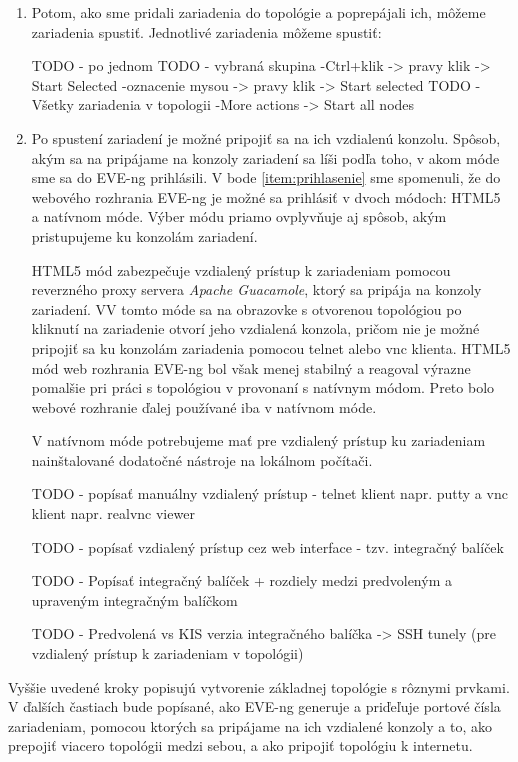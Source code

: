 \begin{enumerate}[noitemsep]
    \item Potom, ako sme pridali zariadenia do topológie a poprepájali ich, môžeme zariadenia spustiť. Jednotlivé zariadenia môžeme spustiť:

{\huge TODO - po jednom}
{\huge TODO - vybraná skupina
      -Ctrl+klik -> pravy klik -> Start Selected
      -oznacenie mysou -> pravy klik -> Start selected}
{\huge TODO - Všetky zariadenia v topologii
      -More actions -> Start all nodes}
      
    \item \label{item:vzdialeny_pristup} Po spustení zariadení je možné pripojiť sa na ich vzdialenú konzolu. Spôsob, akým sa na pripájame na konzoly zariadení sa líši podľa toho, v akom móde sme sa do EVE-ng prihlásili. V bode \ref{item:prihlasenie} sme spomenuli, že do webového rozhrania EVE-ng je možné sa prihlásiť v dvoch módoch: HTML5 a natívnom móde. Výber módu priamo ovplyvňuje aj spôsob, akým pristupujeme ku konzolám zariadení.
    
    HTML5 mód zabezpečuje vzdialený prístup k zariadeniam pomocou reverzného proxy servera \emph{Apache Guacamole}, ktorý sa pripája na konzoly zariadení. VV tomto móde sa na obrazovke s otvorenou topológiou po kliknutí na zariadenie otvorí jeho vzdialená konzola, pričom nie je možné pripojiť sa ku konzolám zariadenia pomocou telnet alebo vnc klienta. HTML5 mód web rozhrania EVE-ng bol však menej stabilný a reagoval výrazne pomalšie pri práci s topológiou v provonaní s natívnym módom. Preto bolo webové rozhranie ďalej používané iba v natívnom móde.
        
     V natívnom móde potrebujeme mať pre vzdialený prístup ku zariadeniam nainštalované dodatočné nástroje na lokálnom počítači. 
        
{\huge TODO - popísať manuálny vzdialený prístup - telnet klient napr. putty a vnc klient napr. realvnc viewer}
        
{\huge TODO - popísať vzdialený prístup cez web interface - tzv. integračný balíček}
        
{\huge TODO - Popísať integračný balíček + rozdiely medzi predvoleným a upraveným integračným balíčkom}
        
{\huge TODO - Predvolená vs KIS verzia integračného balíčka -> SSH tunely (pre vzdialený prístup k zariadeniam v topológii)}

\end{enumerate}

Vyššie uvedené kroky popisujú vytvorenie základnej topológie s rôznymi prvkami. V ďalších častiach bude popísané, ako EVE-ng generuje a priďeľuje portové čísla zariadeniam, pomocou ktorých sa pripájame na ich vzdialené konzoly a to, ako prepojiť viacero topológii medzi sebou, a ako pripojiť topológiu k internetu.




